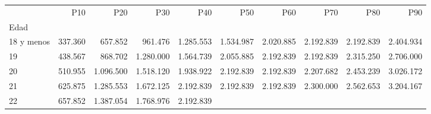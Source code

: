 \begin{tabular}{llllllllll}
\cline{1-10}
\multicolumn{1}{c}{} &
  \multicolumn{1}{|r}{P10} &
  \multicolumn{1}{r}{P20} &
  \multicolumn{1}{r}{P30} &
  \multicolumn{1}{r}{P40} &
  \multicolumn{1}{r}{P50} &
  \multicolumn{1}{r}{P60} &
  \multicolumn{1}{r}{P70} &
  \multicolumn{1}{r}{P80} &
  \multicolumn{1}{r}{P90} \\
\cline{1-10}
\multicolumn{1}{l}{Edad} &
  \multicolumn{1}{|r}{} &
  \multicolumn{1}{r}{} &
  \multicolumn{1}{r}{} &
  \multicolumn{1}{r}{} &
  \multicolumn{1}{r}{} &
  \multicolumn{1}{r}{} &
  \multicolumn{1}{r}{} &
  \multicolumn{1}{r}{} &
  \multicolumn{1}{r}{} \\
\multicolumn{1}{l}{\hspace{1em}18 y menos} &
  \multicolumn{1}{|r}{337.360} &
  \multicolumn{1}{r}{657.852} &
  \multicolumn{1}{r}{961.476} &
  \multicolumn{1}{r}{1.285.553} &
  \multicolumn{1}{r}{1.534.987} &
  \multicolumn{1}{r}{2.020.885} &
  \multicolumn{1}{r}{2.192.839} &
  \multicolumn{1}{r}{2.192.839} &
  \multicolumn{1}{r}{2.404.934} \\
\multicolumn{1}{l}{\hspace{1em}19} &
  \multicolumn{1}{|r}{438.567} &
  \multicolumn{1}{r}{868.702} &
  \multicolumn{1}{r}{1.280.000} &
  \multicolumn{1}{r}{1.564.739} &
  \multicolumn{1}{r}{2.055.885} &
  \multicolumn{1}{r}{2.192.839} &
  \multicolumn{1}{r}{2.192.839} &
  \multicolumn{1}{r}{2.315.250} &
  \multicolumn{1}{r}{2.706.000} \\
\multicolumn{1}{l}{\hspace{1em}20} &
  \multicolumn{1}{|r}{510.955} &
  \multicolumn{1}{r}{1.096.500} &
  \multicolumn{1}{r}{1.518.120} &
  \multicolumn{1}{r}{1.938.922} &
  \multicolumn{1}{r}{2.192.839} &
  \multicolumn{1}{r}{2.192.839} &
  \multicolumn{1}{r}{2.207.682} &
  \multicolumn{1}{r}{2.453.239} &
  \multicolumn{1}{r}{3.026.172} \\
\multicolumn{1}{l}{\hspace{1em}21} &
  \multicolumn{1}{|r}{625.875} &
  \multicolumn{1}{r}{1.285.553} &
  \multicolumn{1}{r}{1.672.125} &
  \multicolumn{1}{r}{2.192.839} &
  \multicolumn{1}{r}{2.192.839} &
  \multicolumn{1}{r}{2.192.839} &
  \multicolumn{1}{r}{2.300.000} &
  \multicolumn{1}{r}{2.562.653} &
  \multicolumn{1}{r}{3.204.167} \\
\multicolumn{1}{l}{\hspace{1em}22} &
  \multicolumn{1}{|r}{657.852} &
  \multicolumn{1}{r}{1.387.054} &
  \multicolumn{1}{r}{1.768.976} &
  \multicolumn{1}{r}{2.192.839} &

\end{tabular}

